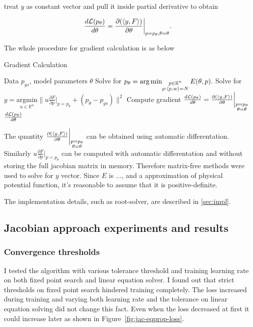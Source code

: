 \documentclass[a4paper,10pt]{report}
\begin{document}
treat $y$ as constant vector and pull it inside partial derivative to obtain


\begin{equation}
 \frac{d\mathcal{L}(p_\theta)}{d \theta} =   \frac{\partial (\langle y, F \rangle)}{\partial \theta}\bigg|_{p=p_\theta, \theta=\theta}.
\end{equation}



The whole procedure for gradient calculation is as below
\begin{algorithm}[H]
\caption{Gradient Calculation}
\begin{algorithmic}[1]
\Require Data $p_{gs}$, model parameters $\theta$
\State  Solve for $p_\theta  = \operatorname*{arg\,min}_{\substack{p \in \mathbb{R}^n \\ p: \langle p, w \rangle=N }} E(\theta, p).$
\State Solve for $y = \underset{u\in \mathbb{R}^n}{\mathrm{argmin}} \bigg\|u \frac{\partial F}{\partial p}\bigg|_{p=p_\theta} + (p_\theta-p_{gs})\bigg\|^2$
\State Compute gradient $\frac{d\mathcal{L}(p_\theta)}{d \theta} = \frac{\partial (\langle y, F \rangle)}{\partial \theta}\bigg|_{\substack{p=p_\theta \\\theta= \theta}}$
\State \Return $\frac{d\mathcal{L}(p_\theta)}{d \theta}$
\end{algorithmic}
\end{algorithm}


The quantity $\frac{\partial (\langle y, F \rangle)}{\partial \theta}\bigg|_{\substack{p=p_\theta \\\theta= \theta}}$ can be obtained using automatic differentation.  Similarly $u \frac{\partial F}{\partial p}\bigg|_{p=p_\theta}$ can be computed with automatic differentation and without storing the full jacobian matrix in memory. Therefore matrix-free methods were used to solve for $y$ vector. Since $E$ is ..., and a approximation of physical potential function, it's reasonable to assume that it is positive-definite.


The implementation details, such as root-solver, are described in \ref{sec:impl}.

\subsection{Jacobian approach experiments and results}

\subsubsection{Convergence thresholds}
 I tested the algorithm with various tolerance threshold and training learning rate on both fixed point search and linear equation solver.
I found out that strict thresholds on fixed point search hindered training completely. The loss increased during training and varying both learning rate and the tolerance on linear equation solving did not change this fact. Even when the loss decreased at first it could increase later as shown in Figure~\ref{fig:jac-eqprop-loss}.
\end{document}
